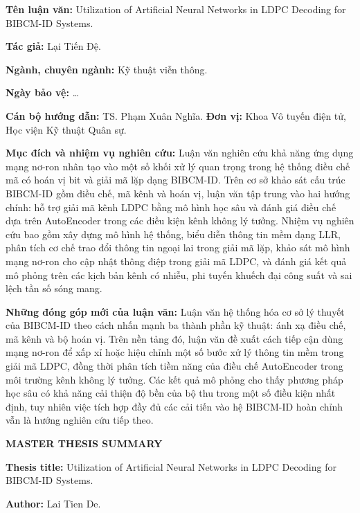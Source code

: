 ﻿\documentclass[a4paper,14pt]{extreport}
\begin{document}
\noindent\textbf{Tên luận văn:} Utilization of Artificial Neural Networks in LDPC Decoding for BIBCM-ID Systems.

\noindent\textbf{Tác giả:} Lại Tiến Đệ.

\noindent\textbf{Ngành, chuyên ngành:} Kỹ thuật viễn thông.

\noindent\textbf{Ngày bảo vệ:} \ldots

\noindent\textbf{Cán bộ hướng dẫn:} TS. Phạm Xuân Nghĩa. \textbf{Đơn vị:} Khoa Vô tuyến điện tử, Học viện Kỹ thuật Quân sự.

\noindent\textbf{Mục đích và nhiệm vụ nghiên cứu:}
Luận văn nghiên cứu khả năng ứng dụng mạng nơ-ron nhân tạo vào một số khối xử lý quan trọng trong hệ thống điều chế mã có hoán vị bit và giải mã lặp dạng BIBCM-ID. Trên cơ sở khảo sát cấu trúc BIBCM-ID gồm điều chế, mã kênh và hoán vị, luận văn tập trung vào hai hướng chính: hỗ trợ giải mã kênh LDPC bằng mô hình học sâu và đánh giá điều chế dựa trên AutoEncoder trong các điều kiện kênh không lý tưởng. Nhiệm vụ nghiên cứu bao gồm xây dựng mô hình hệ thống, biểu diễn thông tin mềm dạng LLR, phân tích cơ chế trao đổi thông tin ngoại lai trong giải mã lặp, khảo sát mô hình mạng nơ-ron cho cập nhật thông điệp trong giải mã LDPC, và đánh giá kết quả mô phỏng trên các kịch bản kênh có nhiễu, phi tuyến khuếch đại công suất và sai lệch tần số sóng mang.

\noindent\textbf{Những đóng góp mới của luận văn:}
Luận văn hệ thống hóa cơ sở lý thuyết của BIBCM-ID theo cách nhấn mạnh ba thành phần kỹ thuật: ánh xạ điều chế, mã kênh và bộ hoán vị. Trên nền tảng đó, luận văn đề xuất cách tiếp cận dùng mạng nơ-ron để xấp xỉ hoặc hiệu chỉnh một số bước xử lý thông tin mềm trong giải mã LDPC, đồng thời phân tích tiềm năng của điều chế AutoEncoder trong môi trường kênh không lý tưởng. Các kết quả mô phỏng cho thấy phương pháp học sâu có khả năng cải thiện độ bền của bộ thu trong một số điều kiện nhất định, tuy nhiên việc tích hợp đầy đủ các cải tiến vào hệ BIBCM-ID hoàn chỉnh vẫn là hướng nghiên cứu tiếp theo.

\newpage
{}
\begin{center}
  {\bfseries MASTER THESIS SUMMARY}
\end{center}

\noindent\textbf{Thesis title:} Utilization of Artificial Neural Networks in LDPC Decoding for BIBCM-ID Systems.

\noindent\textbf{Author:} Lai Tien De.
\end{document}
